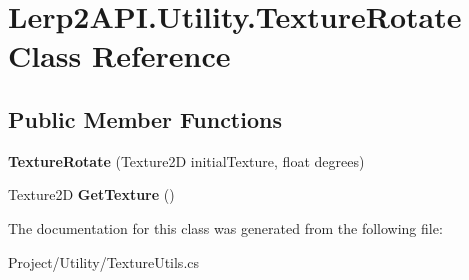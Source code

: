 \hypertarget{class_lerp2_a_p_i_1_1_utility_1_1_texture_rotate}{}\section{Lerp2\+A\+P\+I.\+Utility.\+Texture\+Rotate Class Reference}
\label{class_lerp2_a_p_i_1_1_utility_1_1_texture_rotate}
\subsection*{Public Member Functions}
\begin{DoxyCompactItemize}
\item 
\mbox{\label{class_lerp2_a_p_i_1_1_utility_1_1_texture_rotate_ab9bbcd9d2d0dfb84f4ab7b170027358e}} 
{\bfseries Texture\+Rotate} (Texture2D initial\+Texture, float degrees)
\item 
\mbox{\label{class_lerp2_a_p_i_1_1_utility_1_1_texture_rotate_af11a3d9639834022dd3fdaadc1bc583e}} 
Texture2D {\bfseries Get\+Texture} ()
\end{DoxyCompactItemize}


The documentation for this class was generated from the following file\+:\begin{DoxyCompactItemize}
\item 
Project/\+Utility/Texture\+Utils.\+cs\end{DoxyCompactItemize}
